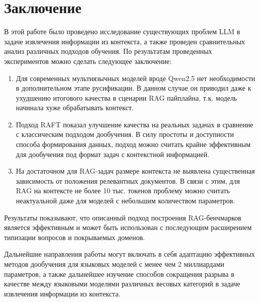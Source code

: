 \section{Заключение}
\label{sec:Final} 

В этой работе было проведено исследование существующих проблем LLM в задаче извлечения информации из контекста, а также проведен сравнительных анализ различных подходов обучения. По результатам проведенных экспериментов можно сделать следующее заключение:

\begin{enumerate}
    \item Для современных мультиязычных моделей вроде Qwen2.5 нет необходимости в дополнительном этапе русификации. В данном случае он приводил даже к ухудшению итогового качества в сценарии RAG пайплайна, т.к. модель начинала хуже обрабатывать контекст.

    \item Подход RAFT показал улучшение качества на реальных задачах в сравнение с классическим подходом дообучения. В силу простоты и доступности способа формирования данных, подход можно считать крайне эффективным для дообучения под формат задач с контекстной информацией.

    \item На достаточном для RAG-задач размере контекста не выявлена существенная зависимость от положения релевантных документов. В связи с этим, для RAG на контексте не более 10 тыс. токенов проблему можно считать неактуальной даже для моделей с небольшим количеством параметров.
\end{enumerate}

Результаты показывают, что описанный подход построения RAG-бенчмарков является эффективным и может быть использован с последующим расширением типизации вопросов и покрываемых доменов.

Дальнейшие направления работы могут включать в себя адаптацию эффективных методов дообучения для языковых моделей с менее чем 2 миллиардами параметров, а также дальнейшее изучение способов сокращения разрыва в качестве между языковыми моделями различных весовых категорий в задаче извлечения информации из контекста.

\newpage





























